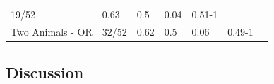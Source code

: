 \documentclass[oneside]{report}
\theoremstyle{definition}
\theoremstyle{definition}
\theoremstyle{definition}
\theoremstyle{remark}
\begin{document}
\begin{longtable}[]{@{}lllllll@{}}
\begin{minipage}[t]{0.07\columnwidth}
19/52\strut
\end{minipage} & \begin{minipage}[t]{0.07\columnwidth}\raggedright\strut
0.63\strut
\end{minipage} & \begin{minipage}[t]{0.06\columnwidth}\raggedright\strut
0.5\strut
\end{minipage} & \begin{minipage}[t]{0.06\columnwidth}\raggedright\strut
0.04\strut
\end{minipage} & \begin{minipage}[t]{0.08\columnwidth}\raggedright\strut
0.51-1\strut
\end{minipage} & \begin{minipage}[t]{0.08\columnwidth}\raggedright\strut
\strut
\end{minipage}\tabularnewline
\begin{minipage}[t]{0.24\columnwidth}\raggedright\strut
Two Animals - OR\strut
\end{minipage} & \begin{minipage}[t]{0.07\columnwidth}\raggedright\strut
32/52\strut
\end{minipage} & \begin{minipage}[t]{0.07\columnwidth}\raggedright\strut
0.62\strut
\end{minipage} & \begin{minipage}[t]{0.06\columnwidth}\raggedright\strut
0.5\strut
\end{minipage} & \begin{minipage}[t]{0.06\columnwidth}\raggedright\strut
0.06\strut
\end{minipage} & \begin{minipage}[t]{0.08\columnwidth}\raggedright\strut
0.49-1\strut
\end{minipage} & \begin{minipage}[t]{0.08\columnwidth}\raggedright\strut
\strut
\end{minipage}\tabularnewline
\bottomrule
\end{longtable}
\subsection{Discussion}\label{discussion-1}
\end{document}

